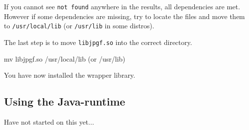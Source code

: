 If you cannot see \texttt{not found} anywhere in the results, all dependencies are met. However if some dependencies are missing, try to locate the files and move them to \texttt{/usr/local/lib} (or \texttt{/usr/lib} in some distros).

The last step is to move \texttt{libjpgf.so} into the correct directory.

\begin{terminal}
mv libjpgf.so /usr/local/lib (or /usr/lib)
\end{terminal}

You have now installed the wrapper library.

\subsection{Using the Java-runtime}
Have not started on this yet...
